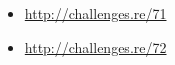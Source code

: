 \sectionold{\Exercises}

\begin{itemize}
	\item \url{http://challenges.re/71}
	\item \url{http://challenges.re/72}
\end{itemize}


